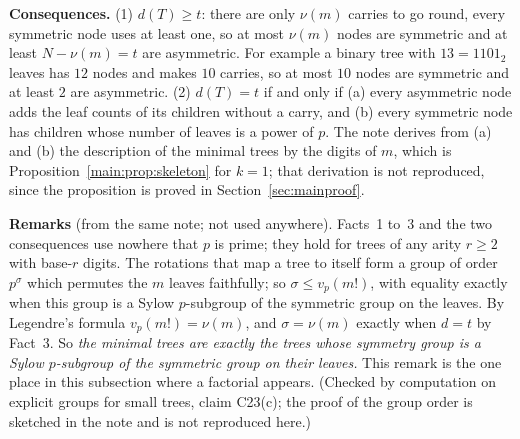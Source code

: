 \documentclass[11pt]{article}
\theoremstyle{definition}
\theoremstyle{remark}
\numberwithin{equation}{section}
\numberwithin{figure}{section}
\begin{document}
\medskip\noindent\textbf{Consequences.} (1) $d(T)\ge t$: there are only $\nu(m)$ carries to go round, every
symmetric node uses at least one, so at most $\nu(m)$ nodes are symmetric and at least $N-\nu(m)=t$ are
asymmetric. For example a binary tree with $13=1101_2$ leaves has $12$ nodes and makes $10$ carries, so at
most $10$ nodes are symmetric and at least $2$ are asymmetric. (2) $d(T)=t$ if and only if (a) every
asymmetric node adds the leaf counts of its children without a carry, and (b) every symmetric node has
children whose number of leaves is a power of $p$. The note derives from (a) and (b) the description of the
minimal trees by the digits of $m$, which is Proposition~\ref{main:prop:skeleton} for $k=1$; that derivation
is not reproduced, since the proposition is proved in Section~\ref{sec:mainproof}.

\medskip\noindent\textbf{Remarks} (from the same note; not used anywhere). Facts~1 to~3 and the two
consequences use nowhere that $p$ is prime; they hold for trees of any arity $r\ge2$ with base-$r$ digits.
The rotations that map a tree to itself form a group of order $p^{\sigma}$ which permutes the $m$ leaves
faithfully; so $\sigma\le v_p(m!)$, with equality exactly when this group is a Sylow $p$-subgroup of the
symmetric group on the leaves. By Legendre's formula $v_p(m!)=\nu(m)$, and $\sigma=\nu(m)$ exactly when $d=t$
by Fact~3. So \emph{the minimal trees are exactly the trees whose symmetry group is a Sylow $p$-subgroup of
the symmetric group on their leaves.} This remark is the one place in this subsection where a factorial
appears. (Checked by computation on explicit groups for small trees, claim C23(c); the proof of the group
order is sketched in the note and is not reproduced here.)
\end{document}
